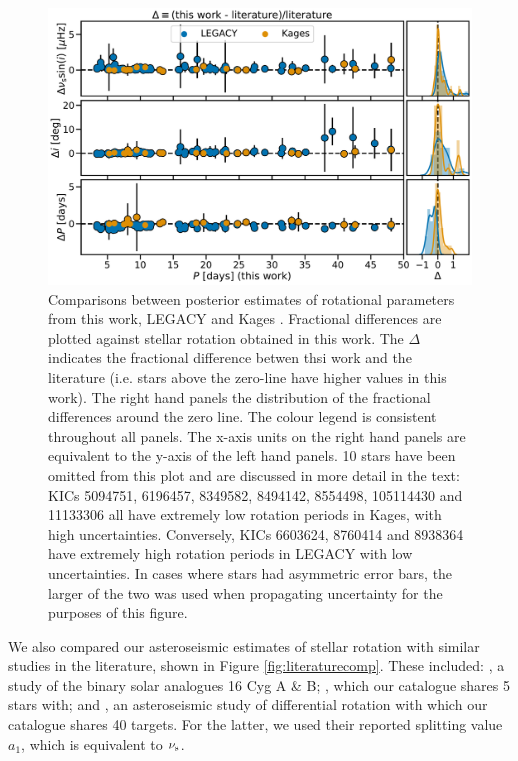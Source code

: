 \begin{figure}
	\centering
	\includegraphics[width=\textwidth]{Images/litcomp_alt2.pdf}
	\caption{Comparisons between posterior estimates of rotational parameters from this work, LEGACY and Kages \cite[private communication]{davies+2016, lund+2017}. Fractional differences are plotted against stellar rotation obtained in this work. The $\Delta$ indicates the fractional difference betwen thsi work and the literature (i.e. stars above the zero-line have higher values in this work). The right hand panels the distribution of the fractional differences around the zero line. The colour legend is consistent throughout all panels. The x-axis units on the right hand panels are equivalent to the y-axis of the left hand panels. 10 stars have been omitted from this plot and are discussed in more detail in the text: KICs 5094751, 6196457, 8349582, 8494142, 8554498, 105114430 and 11133306 all have extremely low rotation periods in Kages, with high uncertainties. Conversely, KICs 6603624, 8760414 and 8938364 have extremely high rotation periods in LEGACY with low uncertainties. In cases where stars had asymmetric error bars, the larger of the two was used when propagating uncertainty for the purposes of this figure.}
	\label{fig:legacykages}
\end{figure}

We also compared our asteroseismic estimates of stellar rotation with similar studies in the literature, shown in Figure \ref{fig:literaturecomp}. These included: \cite{davies+2015}, a study of the binary solar analogues 16 Cyg A \& B; \cite{nielsen+2015}, which our catalogue shares 5 stars with; and \cite{benomar+2018}, an asteroseismic study of differential rotation with which our catalogue shares 40 targets. For the latter, we used their reported splitting value $a_1$, which is equivalent to $\nu_{\rm s}$. 

